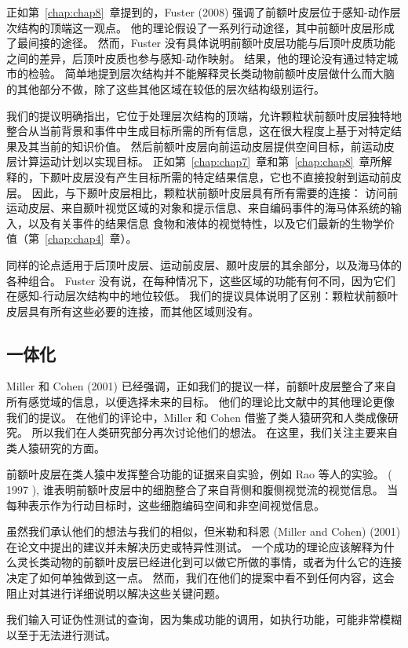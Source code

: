 正如第~\ref{chap:chap8}~章提到的，Fuster (2008) 强调了前额叶皮层位于感知-动作层次结构的顶端这一观点。
他的理论假设了一系列行动途径，其中前额叶皮层形成了最间接的途径。
然而，Fuster 没有具体说明前额叶皮层功能与后顶叶皮质功能之间的差异，后顶叶皮质也参与感知-动作映射。
结果，他的理论没有通过特定城市的检验。
简单地提到层次结构并不能解释灵长类动物前额叶皮层做什么而大脑的其他部分不做，除了这些其他区域在较低的层次结构级别运行。
\par


我们的提议明确指出，它位于处理层次结构的顶端，允许颗粒状前额叶皮层独特地整合从当前背景和事件中生成目标所需的所有信息，这在很大程度上基于对特定结果及其当前的知识价值。
然后前额叶皮层向前运动皮层提供空间目标，前运动皮层计算运动计划以实现目标。
正如第~\ref{chap:chap7}~章和第~\ref{chap:chap8}~章所解释的，下颞叶皮层没有产生目标所需的特定结果信息，它也不直接投射到运动前皮层。
因此，与下颞叶皮层相比，颗粒状前额叶皮层具有所有需要的连接：
访问前运动皮层、来自颞叶视觉区域的对象和提示信息、来自编码事件的海马体系统的输入，以及有关事件的结果信息 食物和液体的视觉特性，以及它们最新的生物学价值（第~\ref{chap:chap4}~章）。
\par


同样的论点适用于后顶叶皮层、运动前皮层、颞叶皮层的其余部分，以及海马体的各种组合。
Fuster 没有说，在每种情况下，这些区域的功能有何不同，因为它们在感知-行动层次结构中的地位较低。
我们的提议具体说明了区别：颗粒状前额叶皮层具有所有这些必要的连接，而其他区域则没有。



\subsection{一体化}

Miller 和 Cohen (2001) 已经强调，正如我们的提议一样，前额叶皮层整合了来自所有感觉域的信息，以便选择未来的目标。 他们的理论比文献中的其他理论更像我们的提议。 在他们的评论中，Miller 和 Cohen 借鉴了类人猿研究和人类成像研究。 所以我们在人类研究部分再次讨论他们的想法。 在这里，我们关注主要来自类人猿研究的方面。
\par 
前额叶皮层在类人猿中发挥整合功能的证据来自实验，例如 Rao 等人的实验。 ( 1997 ), 谁表明前额叶皮层中的细胞整合了来自背侧和腹侧视觉流的视觉信息。 当每种表示作为行动目标时，这些细胞编码空间和非空间视觉信息。
\par 
虽然我们承认他们的想法与我们的相似，但米勒和科恩 (Miller and Cohen) (2001) 在论文中提出的建议并未解决历史或特异性测试。 一个成功的理论应该解释为什么灵长类动物的前额叶皮层已经进化到可以做它所做的事情，或者为什么它的连接决定了如何单独做到这一点。 然而，我们在他们的提案中看不到任何内容，这会阻止对其进行详细说明以解决这些关键问题。
\par 
我们输入可证伪性测试的查询，因为集成功能的调用，如执行功能，可能非常模糊以至于无法进行测试。
